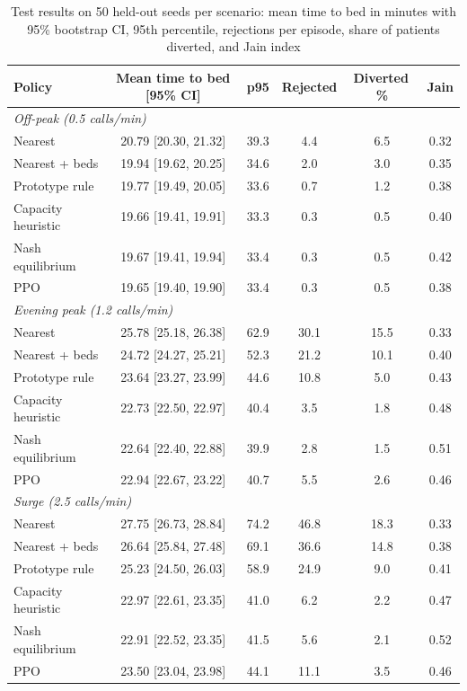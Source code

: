 \documentclass[conference]{IEEEtran}
\begin{document}
\begin{table}[t]
\caption{Test results on 50 held-out seeds per scenario: mean time to bed in minutes with 95\% bootstrap CI, 95th percentile, rejections per episode, share of patients diverted, and Jain index}
\label{tab:main}
\centering\footnotesize
\begin{tabular}{lccccc}
\toprule
Policy & Mean time to bed [95\% CI] & p95 & Rejected & Diverted\,\% & Jain \\
\midrule
\multicolumn{6}{l}{\textit{Off-peak (0.5 calls/min)}} \\
Nearest & 20.79 [20.30, 21.32] & 39.3 & 4.4 & 6.5 & 0.32 \\
Nearest + beds & 19.94 [19.62, 20.25] & 34.6 & 2.0 & 3.0 & 0.35 \\
Prototype rule & 19.77 [19.49, 20.05] & 33.6 & 0.7 & 1.2 & 0.38 \\
Capacity heuristic & 19.66 [19.41, 19.91] & 33.3 & 0.3 & 0.5 & 0.40 \\
Nash equilibrium & 19.67 [19.41, 19.94] & 33.4 & 0.3 & 0.5 & 0.42 \\
PPO & 19.65 [19.40, 19.90] & 33.4 & 0.3 & 0.5 & 0.38 \\
\midrule
\multicolumn{6}{l}{\textit{Evening peak (1.2 calls/min)}} \\
Nearest & 25.78 [25.18, 26.38] & 62.9 & 30.1 & 15.5 & 0.33 \\
Nearest + beds & 24.72 [24.27, 25.21] & 52.3 & 21.2 & 10.1 & 0.40 \\
Prototype rule & 23.64 [23.27, 23.99] & 44.6 & 10.8 & 5.0 & 0.43 \\
Capacity heuristic & 22.73 [22.50, 22.97] & 40.4 & 3.5 & 1.8 & 0.48 \\
Nash equilibrium & 22.64 [22.40, 22.88] & 39.9 & 2.8 & 1.5 & 0.51 \\
PPO & 22.94 [22.67, 23.22] & 40.7 & 5.5 & 2.6 & 0.46 \\
\midrule
\multicolumn{6}{l}{\textit{Surge (2.5 calls/min)}} \\
Nearest & 27.75 [26.73, 28.84] & 74.2 & 46.8 & 18.3 & 0.33 \\
Nearest + beds & 26.64 [25.84, 27.48] & 69.1 & 36.6 & 14.8 & 0.38 \\
Prototype rule & 25.23 [24.50, 26.03] & 58.9 & 24.9 & 9.0 & 0.41 \\
Capacity heuristic & 22.97 [22.61, 23.35] & 41.0 & 6.2 & 2.2 & 0.47 \\
Nash equilibrium & 22.91 [22.52, 23.35] & 41.5 & 5.6 & 2.1 & 0.52 \\
PPO & 23.50 [23.04, 23.98] & 44.1 & 11.1 & 3.5 & 0.46 \\
\bottomrule
\end{tabular}
\end{table}
\end{document}

